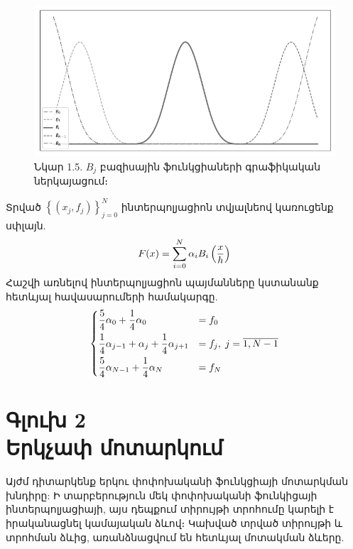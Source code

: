 \documentclass[fleqn, bachelor,subf,12pt,notitlepage]{article}
\begin{document}
\begin{figure}[h!]
\centering
\includegraphics[width=1.0\textwidth]{images/all_cubic_compact_support_basis}
\captionsetup{labelformat=empty}
\caption{\hfill Նկար 1.5. $B_{j}$ բազիսային ֆունկցիաների գրաֆիկական ներկայացում։}
\end{figure}
Տրված $\left\{\left(x_{j}, f_{j}\right)\right\}_{j=0}^{N}$ ինտերպոլյացիոն տվյալնեով կառուցենք սփլայն.
\begin{equation}
F(x) = \sum_{i=0}^{N} \alpha_{i}B_{i}\left(\frac{x}{h}\right)$$
\end{equation}
Հաշվի առնելով ինտերպոլյացիոն պայմանները կստանանք հետևյալ հավասարումերի համակարգը.
\begin{equation}
\begin{dcases}
\frac{5}{4}\alpha_{0} + \frac{1}{4}\alpha_{0} &= f_{0}\\
\frac{1}{4}\alpha_{j-1} + \alpha_{j} + \frac{1}{4}\alpha_{j+1} &= f_{j}, \; j=\overline{1, N-1}\\
\frac{5}{4}\alpha_{N-1} + \frac{1}{4}\alpha_{N} &= f_{N}\\
\end{dcases}
\end{equation}
\newpage
\section*{\centering Գլուխ 2 \\ Երկչափ մոտարկում}
\setcounter{equation}{0}
Այժմ դիտարկենք երկու փոփոխականի ֆունկցիայի մոտարկման խնդիրը: Ի տարբերություն մեկ փոփոխականի ֆունկիցայի ինտերպոլյացիայի, այս դեպքում տիրույթի տրոհումը կարելի է իրականացնել կամայական ձևով։ Կախված տրված տիրույթի և տրոհման ձևից, առանձնացվում են հետևյալ մոտակման ձևերը.
\end{document}
